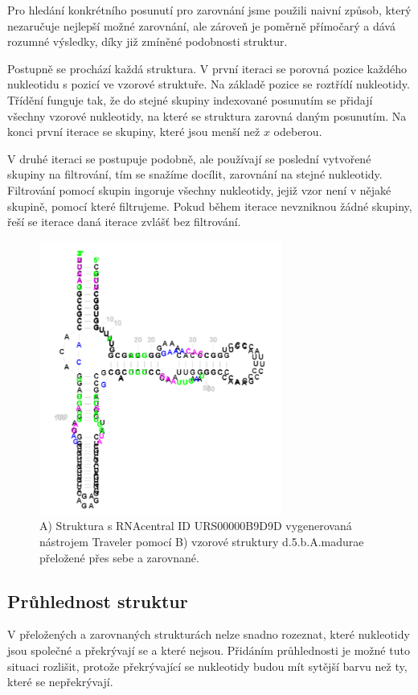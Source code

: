 Pro hledání konkrétního posunutí pro zarovnání jsme použili naivní způsob,
který nezaručuje nejlepší možné zarovnání, ale zároveň je poměrně přímočarý a
dává rozumné výsledky, díky již zmíněné podobnosti struktur.

Postupně se prochází každá struktura. V první iteraci se porovná pozice každého
nukleotidu s pozicí ve vzorové struktuře. Na základě pozice se roztřídí
nukleotidy. Třídění funguje tak, že do stejné skupiny indexované posunutím se
přidají všechny vzorové nukleotidy, na které se struktura zarovná daným posunutím.
Na konci první iterace se skupiny, které jsou menší než $x$ odeberou.

V druhé iteraci se postupuje podobně, ale používají se poslední vytvořené
skupiny na filtrování, tím se snažíme docílit, zarovnání na stejné nukleotidy.
Filtrování pomocí skupin ingoruje všechny nukleotidy, jejiž vzor není v nějaké
skupině, pomocí které filtrujeme. Pokud během iterace nevzniknou žádné skupiny,
řeší se iterace daná iterace zvlášť bez filtrování.

\begin{figure}[H]
  \centering
  \includegraphics[height=90mm]{../img/kap02/align/alignedAlpha1.png}
  \caption{A) Struktura s RNAcentral ID URS00000B9D9D vygenerovaná nástrojem
  Traveler pomocí B) vzorové struktury d.5.b.A.madurae přeložené přes sebe a
  zarovnané.}
\end{figure}

\subsection{Průhlednost struktur}

V přeložených a zarovnaných strukturách nelze snadno rozeznat, které nukleotidy
jsou společné a překrývají se a které nejsou. Přidáním průhlednosti je možné
tuto situaci rozlišit, protože překrývající se nukleotidy budou mít sytější
barvu než ty, které se nepřekrývají.

